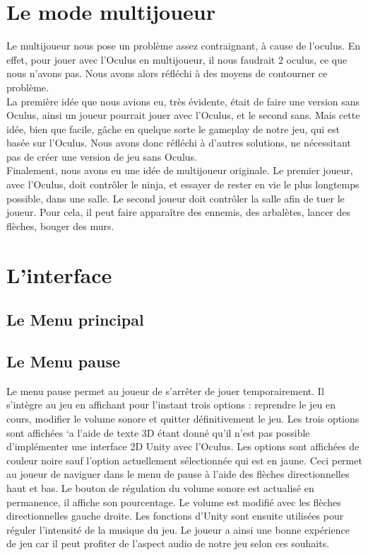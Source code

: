 \documentclass[12pt]{article}
\begin{document}
\section{Le mode multijoueur}

Le multijoueur nous pose un problème assez contraignant, à cause de l'oculus. En effet, pour jouer avec l'Oculus en multijoueur, il nous faudrait 2 oculus, ce que nous n'avons pas. Nous avons alors réfléchi à des moyens de contourner ce problème.\\
La première idée que nous avions eu, très évidente, était de faire une version sans Oculus, ainsi un joueur pourrait jouer avec l'Oculus, et le second sans. Mais cette idée, bien que facile, gâche en quelque sorte le gameplay de notre
jeu, qui est basée sur l'Oculus. Nous avons donc réfléchi à d'autres solutions, ne nécessitant pas de créer une version de jeu sans Oculus.\\
Finalement, nous avons eu une idée de multijoueur originale. Le premier joueur, avec l'Oculus, doit contrôler le ninja, et essayer de rester en vie le plus longtemps possible, dans une salle. Le second joueur doit contrôler la salle afin de tuer le joueur. Pour cela, il peut faire apparaître des ennemis, des arbalètes, lancer des flèches, bouger des murs.



\section{L'interface}

\subsection{Le Menu principal}

\subsection{Le Menu pause}

Le menu pause permet au joueur de s’arrêter de jouer temporairement. Il s’intègre au jeu en affichant pour l’instant trois options : reprendre le jeu en cours, modifier le volume sonore et quitter définitivement le jeu. Les trois options sont affichées `a l’aide de texte 3D étant donné qu’il n’est pas possible d’implémenter une interface 2D Unity avec l’Oculus. Les options sont affichées de couleur noire sauf l’option actuellement sélectionnée qui est en jaune. Ceci permet au joueur de naviguer dans le menu de pause à l’aide des flèches directionnelles haut et bas. Le bouton de régulation du volume sonore est actualisé en permanence, il affiche son pourcentage. Le volume est modifié avec les flèches directionnelles gauche droite. Les fonctions d’Unity sont ensuite utilisées pour réguler l’intensité de la musique du jeu. Le joueur a ainsi une bonne expérience de jeu car il peut profiter de l’aspect audio de notre jeu selon ces souhaits.
\end{document}
